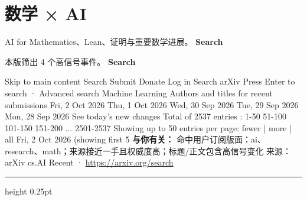 \documentclass[10.5pt]{ctexart}
\begin{document}
\section*{数学 × AI}
{\color{ormuted} AI for Mathematics、Lean、证明与重要数学进展。}
\vspace{2mm}
{\LARGE\bfseries Search}\par
\vspace{1mm}
{\color{ormuted} 本版筛出 4 个高信号事件。}
\vspace{3mm}
{\Large\bfseries Search}\par
Skip to main content Search Submit Donate Log in Search arXiv Press Enter to search · Advanced search Machine Learning Authors and titles for recent submissions Fri, 2 Oct 2026 Thu, 1 Oct 2026 Wed, 30 Sep 2026 Tue, 29 Sep 2026 Mon, 28 Sep 2026 See today's new changes Total of 2537 entries : 1-50 51-100 101-150 151-200 ... 2501-2537 Showing up to 50 entries per page: fewer | more | all Fri, 2 Oct 2026 (showing first 5
\textbf{与你有关：} 命中用户订阅版面：ai、research、math；来源接近一手且权威度高；标题/正文包含高信号变化
{\footnotesize\color{ormuted} 来源：arXiv cs.AI Recent · \url{https://arxiv.org/search}}
\vspace{4mm}
\hrule height 0.25pt
\vspace{3mm}
\end{document}
